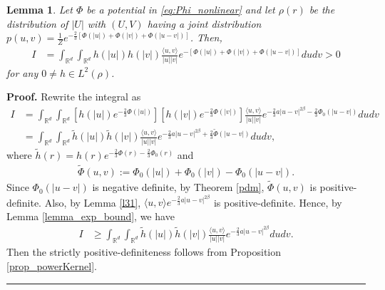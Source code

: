 \documentclass[]{elsarticle}
\def\R{\mathbb{R}}
\def\E{\mathbb{E}}
\newcommand{\mbf}[1]{\boldsymbol{#1}}
\newcommand{\innerp}[2]{\langle #1,#2 \rangle}
\newcommand{\inp}[1]{\langle{#1}\rangle}
\newcommand{\br}{\mbf{r}}
\newtheorem{lemma}[theorem]{Lemma}
\newtheorem{remark}[theorem]{Remark}
\newenvironment{proof}[1][Proof]{\noindent\textbf{#1.} }{\ \rule{0.5em}{0.5em}}
\numberwithin{equation}{section}
\numberwithin{theorem}{section}
\begin{document}
\begin{lemma}\label{lemma:transform_to_positve}
Let $\Phi$ be a potential in \eqref{eq:Phi_nonlinear} and let $\rho(r)$ be the distribution of $|U|$ with $(U,V)$ having a joint distribution $p(u,v)= \frac{1}{Z} e^{-\frac{2}{3}  [\Phi(|u|)+ \Phi(|v|)+\Phi(|u-v|) ]  }$.
Then,
 \begin{align*}
I %
&=\int_{\R^d}\int_{\R^d}h(|u|)h(|v|)\frac{\langle u,v \rangle}{|u||v|}e^{-[\Phi(|u|)+ \Phi(|v|)+\Phi(|u-v|) ] }dudv >0
\end{align*}
for any $0\neq h\in L^2(\rho)$. 
\end{lemma}
\begin{proof}
Rewrite the integral as
\begin{align*}
I  &=\int_{\R^d}\int_{\R^d}[h(|u|)e^{-\frac{2}{3}\Phi(|u|)}][h(|v|)e^{-\frac{2}{3}\Phi(|v|)}]\frac{\langle u,v \rangle}{|u||v|}e^{-\frac{2}{3}a|u-v|^{2\beta}-\frac{2}{3}\Phi_0(|u-v|)}dudv\\
&=\int_{\R^d}\int_{\R^d}\widetilde h(|u|)\widetilde h(|v|)\frac{\langle u,v \rangle}{|u||v|}e^{-\frac{2}{3}a |u-v|^{2\beta}+\frac{2}{3}\widetilde \Phi(|u-v|)}dudv,
\end{align*}
where $\widetilde h(r)= h(r)e^{-\frac{2}{3}\Phi(r) -\frac{2}{3}\Phi_0(r)}$ and 
\begin{eqnarray*}
\widetilde{\Phi}(u,v):=\Phi_0(|u|)+\Phi_0(|v|)-\Phi_0(|u-v|).
\end{eqnarray*}
Since $\Phi_0(|u-v|)$ is negative definite, by Theorem \ref{pdm}, $\widetilde{\Phi}(u,v)$ is positive-definite. Also, by Lemma \ref{l31}, $\inp{u,v}e^{-\frac{2}{3}a |u-v|^{2\beta} }$ is positive-definite. 
Hence, by Lemma \ref{lemma_exp_bound}, we have
\begin{align*}
I &\geq \int_{\R^d}\int_{\R^d}\widetilde h(|u|)\widetilde h(|v|)\frac{\langle u,v \rangle}{|u||v|}e^{-\frac{2}{3}a |u-v|^{2\beta}}dudv.
\end{align*}
Then the strictly positive-definiteness follows from Proposition \ref{prop_powerKernel}. 
\end{proof}


\end{document}

